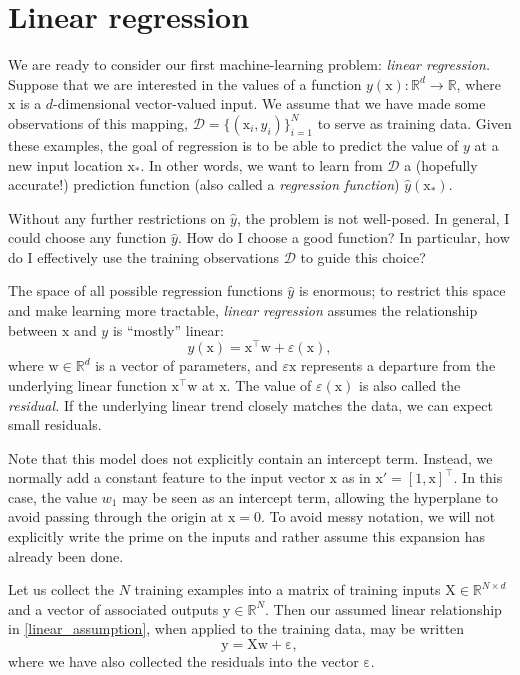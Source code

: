 \documentclass{article}
\newcommand{\mc}[1]{\mathcal{#1}}
\newcommand{\data}{\mc{D}}
\newcommand{\trans}{^\top}
\newcommand{\mat}[1]{\bm{\mathrm{#1}}}
\renewcommand{\vec}[1]{\bm{\mathrm{#1}}}
\newcommand{\R}{\mathbb{R}}
\renewcommand{\epsilon}{\varepsilon}
\begin{document}
\section*{Linear regression}

We are ready to consider our first machine-learning problem:
\emph{linear regression.}  Suppose that we are interested in the
values of a function $y(\vec{x})\colon \R^d \to \R$, where $\vec{x}$ is
a $d$-dimensional vector-valued input.  We assume that we have made
some observations of this mapping, $\data = \bigl\{ (\vec{x}_i, y_i)
\bigr\}_{i = 1}^N$ to serve as training data.  Given these examples,
the goal of regression is to be able to predict the value of $y$ at a
new input location $\vec{x}_\ast$.  In other words, we want to learn
from $\data$ a (hopefully accurate!) prediction function (also called
a \emph{regression function}) $\hat{y}(\vec{x}_\ast)$.

Without any further restrictions on $\hat{y}$, the problem is not
well-posed.  In general, I could choose any function $\hat{y}$.  How
do I choose a good function?  In particular, how do I effectively use
the training observations $\data$ to guide this choice?

The space of all possible regression functions $\hat{y}$ is enormous;
to restrict this space and make learning more tractable, \emph{linear
  regression} assumes the relationship between $\vec{x}$ and $y$ is
``mostly'' linear:
\begin{equation}
  \label{linear_assumption}
  y(\vec{x}) = \vec{x}\trans \vec{w} + \epsilon(\vec{x}),
\end{equation}
where $\vec{w} \in \R^d$ is a vector of parameters, and
$\epsilon{\vec{x}}$ represents a departure from the underlying linear
function $\vec{x}\trans \vec{w}$ at $\vec{x}$.  The value of
$\epsilon(\vec{x})$ is also called the \emph{residual.}  If the
underlying linear trend closely matches the data, we can expect
small residuals.

Note that this model does not explicitly contain an intercept term.
Instead, we normally add a constant feature to the input vector
$\vec{x}$ as in $\vec{x}' = [1, \vec{x}]\trans$.  In this case, the value
$w_1$ may be seen as an intercept term, allowing the hyperplane to
avoid passing through the origin at $\vec{x} = 0$.  To avoid messy
notation, we will not explicitly write the prime on the inputs and
rather assume this expansion has already been done.

Let us collect the $N$ training examples into a matrix of training
inputs $\vec{X} \in \R^{N \times d}$ and a vector of associated outputs
$\vec{y} \in \R^N$.  Then our assumed linear relationship in
\eqref{linear_assumption}, when applied to the training data, may be
written
\begin{equation*}
  \vec{y} = \mat{X}\vec{w} + \vec{\epsilon},
\end{equation*}
where we have also collected the residuals into the vector
$\vec{\epsilon}$.
\end{document}
